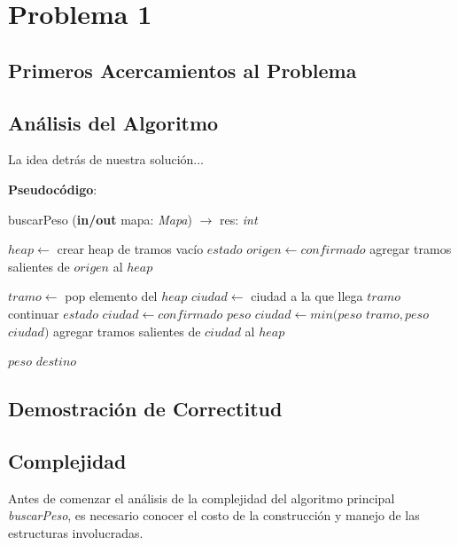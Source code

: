 \section{Problema 1}


\subsection{Primeros Acercamientos al Problema}


\subsection{Análisis del Algoritmo}

\indent La idea detrás de nuestra solución...

\textbf{Pseudocódigo}:

\begin{algorithm}
\caption{buscarPeso (\textbf{in/out} mapa: \textsl{Mapa}) $\rightarrow$ res: \textsl{int}}
\begin{algorithmic}[1]

\STATE $heap \leftarrow$ crear heap de tramos vacío
\STATE $estado$ $origen \leftarrow confirmado$
\STATE agregar tramos salientes de $origen$ al $heap$

	\STATE $tramo \leftarrow$ pop elemento del $heap$
	\STATE $ciudad \leftarrow$ ciudad a la que llega $tramo$
	 \STATE continuar
	\ENDIF
	\STATE $estado$ $ciudad \leftarrow confirmado$
	\STATE $peso$ $ciudad \leftarrow min(peso$ $tramo,peso$ $ciudad)$
	\STATE agregar tramos salientes de $ciudad$ al $heap$
	
\ENDWHILE
\RETURN $peso$ $destino$  
\end{algorithmic}
\end{algorithm}

\subsection{Demostración de Correctitud}


\subsection{Complejidad}

Antes de comenzar el análisis de la complejidad del algoritmo principal \textsl{buscarPeso}, es necesario conocer el costo de la construcción y manejo de las estructuras involucradas.\\

